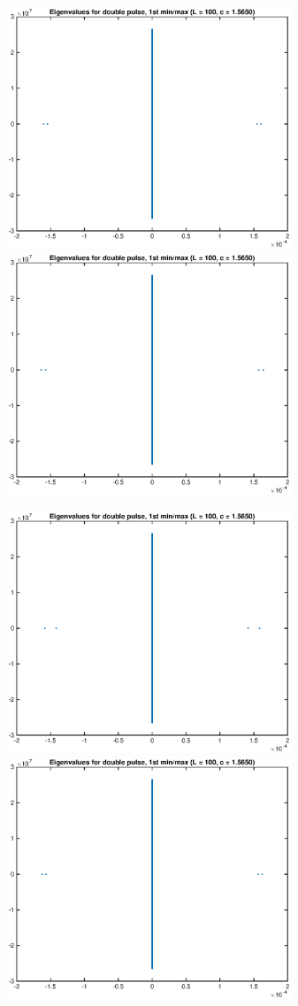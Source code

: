 \documentclass[12pt]{article}
\begin{document}
	\begin{figure}[H]
	\includegraphics[width=8.5cm]{L100eigs3.eps}
	\includegraphics[width=8.5cm]{L100eigs4.eps}
	\end{figure}
	\begin{figure}[H]
	\includegraphics[width=8.5cm]{L100eigs5.eps}
	\includegraphics[width=8.5cm]{L100eigs6.eps}
	\end{figure}
\end{document}
